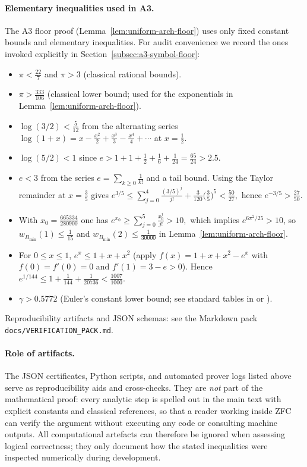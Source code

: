 \paragraph{Elementary inequalities used in A3.}
The A3 floor proof (Lemma~\ref{lem:uniform-arch-floor}) uses only fixed constant bounds and
elementary inequalities. For audit convenience we record the ones invoked explicitly in
Section~\ref{subsec:a3-symbol-floor}:
\begin{itemize}[leftmargin=2.2em]
  \item $\pi<\tfrac{22}{7}$ and $\pi>3$ (classical rational bounds).
  \item $\pi>\tfrac{333}{106}$ (classical lower bound; used for the exponentials in Lemma~\ref{lem:uniform-arch-floor}).
  \item $\log(3/2)<\tfrac{5}{12}$ from the alternating series
  $\log(1+x)=x-\tfrac{x^2}{2}+\tfrac{x^3}{3}-\tfrac{x^4}{4}+\cdots$ at $x=\tfrac12$.
  \item $\log(5/2)<1$ since $e>1+1+\tfrac12+\tfrac16+\tfrac{1}{24}=\tfrac{65}{24}>2.5$.
  \item $e<3$ from the series $e=\sum_{k\ge0}\tfrac{1}{k!}$ and a tail bound. Using the Taylor remainder at $x=\tfrac35$ gives
  \(
    e^{3/5}
    \le \sum_{j=0}^{4}\frac{(3/5)^j}{j!}+\frac{3}{120}\Big(\frac{3}{5}\Big)^{5}
    <\frac{50}{27},
  \)
  hence $e^{-3/5}>\tfrac{27}{50}$.
  \item With $x_0=\frac{665334}{280900}$ one has
  \(
    e^{x_0}\ge \sum_{j=0}^{5}\frac{x_0^j}{j!}>10,
  \)
  which implies $e^{6\pi^2/25}>10$, so
  \(w_{B_{\min}}(1)\le \tfrac{1}{15}\) and \(w_{B_{\min}}(2)\le \tfrac{1}{30000}\) in Lemma~\ref{lem:uniform-arch-floor}.
  \item For $0\le x\le 1$, $e^x\le 1+x+x^2$ (apply $f(x)=1+x+x^2-e^x$ with
  $f(0)=f'(0)=0$ and $f'(1)=3-e>0$). Hence $e^{1/144}\le 1+\tfrac{1}{144}+\tfrac{1}{20736}<\tfrac{1007}{1000}$.
  \item $\gamma>0.5772$ (Euler's constant lower bound; see standard tables in
  \cite{Titchmarsh1986} or \cite{NISTDLMF}).
\end{itemize}

Reproducibility artifacts and JSON schemas: see the Markdown pack \texttt{docs/VERIFICATION\_PACK.md}.

\paragraph{Role of artifacts.}
The JSON certificates, Python scripts, and automated prover logs listed above serve as reproducibility aids and cross-checks. They are \emph{not} part of the mathematical proof: every analytic step is spelled out in the main text with explicit constants and classical references, so that a reader working inside ZFC can verify the argument without executing any code or consulting machine outputs. All computational artefacts can therefore be ignored when assessing logical correctness; they only document how the stated inequalities were inspected numerically during development.

